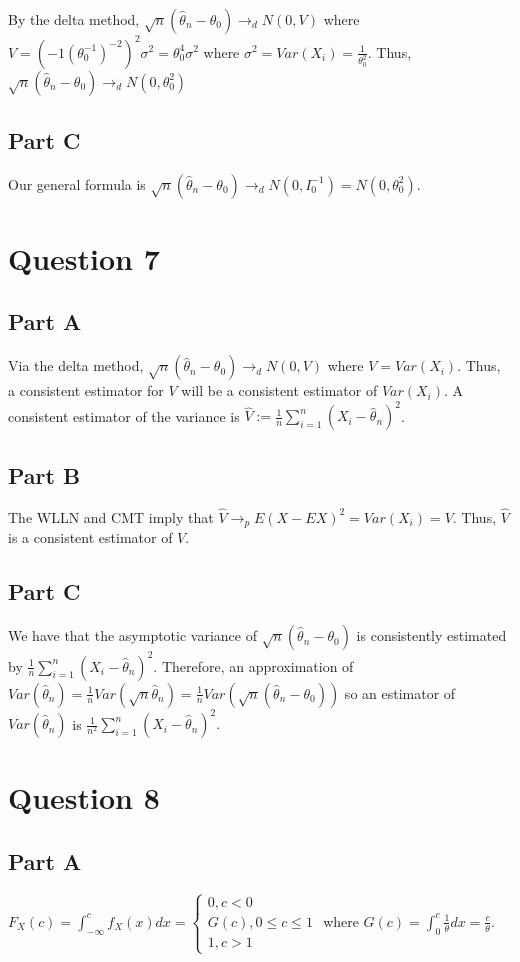 \documentclass[11pt]{article} %
\begin{document}
By the delta method, $\sqrt{n}(\hat{\theta}_n - \theta_0) \rightarrow_d N(0,V)$ where $V = (-1(\theta_0^{-1})^{-2})^2 \sigma^2 = \theta_0^{4}\sigma^2$ where $\sigma^2 = Var(X_i) =  \frac{1}{\theta_0^2}$. Thus, $\sqrt{n}(\hat{\theta}_n - \theta_0) \rightarrow_d N(0,\theta_0^{2})$
\subsection{Part C}
Our general formula is $\sqrt{n}(\hat{\theta}_n - \theta_0) \rightarrow_d N(0,I_0^{-1}) = N(0,\theta_0^2)$.
\section{Question 7} %
\subsection{Part A}
Via the delta method, $\sqrt{n}(\hat{\theta}_n - \theta_0) \rightarrow_d N(0,V)$ where $V = Var(X_i).$ Thus, a consistent estimator for $V$ will be a consistent estimator of $Var(X_i).$ A consistent estimator of the variance is $\hat{V} := \frac{1}{n}\sum_{i=1}^{n}(X_i - \hat{\theta}_n)^2$.
\subsection{Part B}
The WLLN and CMT imply that $\hat{V} \rightarrow_p E(X - EX)^2 = Var(X_i) = V$. Thus, $\hat{V}$ is a consistent estimator of $V$.
\subsection{Part C}
We have that the asymptotic variance of $\sqrt{n}(\hat{\theta}_n - \theta_0)$ is consistently estimated by $\frac{1}{n}\sum_{i=1}^{n}(X_i - \hat{\theta}_n)^2.$ Therefore, an approximation of $Var(\hat{\theta}_n) =\frac{1}{n}Var(\sqrt{n}\hat{\theta}_n) = \frac{1}{n}Var(\sqrt{n}(\hat{\theta}_n - \theta_0))$ so an estimator of $Var(\hat{\theta}_n)$ is $\frac{1}{n^2}\sum_{i=1}^{n}(X_i - \hat{\theta}_n)^2.$
\section{Question 8} %
\subsection{Part A}
$F_X(c) = \int_{-\infty}^c f_X(x)dx = \begin{cases} 0, c<0 \\ G(c), 0\leq c \leq 1 \\1, c>1 \end{cases}$ where $G(c) = \int_{0}^c \frac{1}{\theta} dx = \frac{c}{\theta}.$
\end{document}
